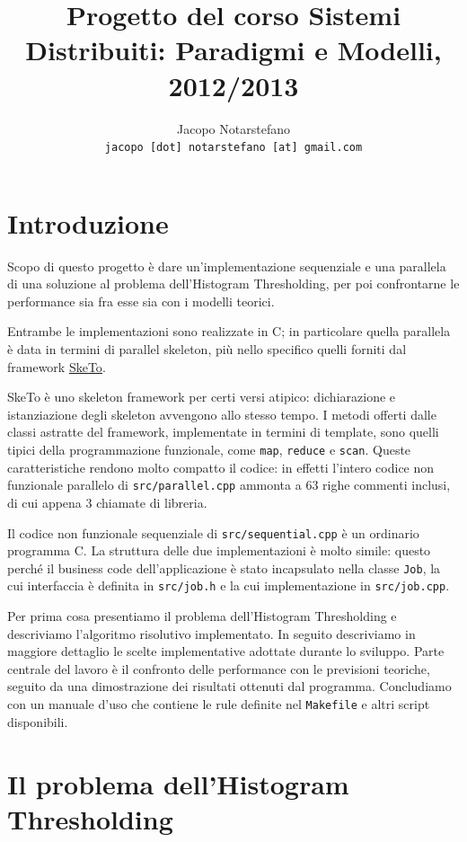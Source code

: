 \documentclass[12pt]{article}
\title{Progetto del corso Sistemi Distribuiti: Paradigmi e Modelli, 2012/2013}
\author{
	Jacopo Notarstefano\\
	\texttt{jacopo [dot] notarstefano [at] gmail.com}
}
\date{}
\newcommand{\cpp}{C\nolinebreak\hspace{-.05em}\raisebox{.4ex}{\tiny\bf +}\nolinebreak\hspace{-.10em}\raisebox{.4ex}{\tiny\bf +}}
\begin{document}
  \maketitle
    \section{Introduzione}

    Scopo di questo progetto è dare un'implementazione sequenziale e una
    parallela di una soluzione al problema dell'Histogram Thresholding, per
    poi confrontarne le performance sia fra esse sia con i modelli teorici.

    Entrambe le implementazioni sono realizzate in \cpp; in particolare
    quella parallela è data in termini di parallel skeleton, più nello
    specifico quelli forniti dal framework 
    \href{http://sketo.ipl-lab.org/}{\underline{SkeTo}}.

    SkeTo è uno skeleton framework per certi versi atipico: dichiarazione e
    istanziazione degli skeleton avvengono allo stesso tempo. I metodi
    offerti dalle classi astratte del framework, implementate in termini di
    template, sono quelli tipici della programmazione funzionale, come
    \texttt{map}, \texttt{reduce} e \texttt{scan}. Queste caratteristiche
    rendono molto compatto il codice: in effetti l'intero codice non
    funzionale parallelo di \texttt{src/parallel.cpp} ammonta a \(63\) righe 
    commenti inclusi, di cui appena \(3\) chiamate di libreria.

    Il codice non funzionale sequenziale di \texttt{src/sequential.cpp} \`e
    un ordinario programma \cpp. La struttura delle due implementazioni \`e
    molto simile: questo perch\'e il business code dell'applicazione \`e
    stato incapsulato nella classe \texttt{Job}, la cui interfaccia \`e
    definita in \texttt{src/job.h} e la cui implementazione in
    \texttt{src/job.cpp}.

    Per prima cosa presentiamo il problema dell'Histogram Thresholding e
    descriviamo l'algoritmo risolutivo implementato. In seguito descriviamo in
    maggiore dettaglio le scelte implementative adottate durante lo sviluppo.
    Parte centrale del lavoro \`e il confronto delle performance con le
    previsioni teoriche, seguito da una dimostrazione dei risultati ottenuti
    dal programma. Concludiamo con un manuale d'uso che contiene le rule
    definite nel \texttt{Makefile} e altri script disponibili.

    \section{Il problema dell'Histogram Thresholding}
\end{document}
